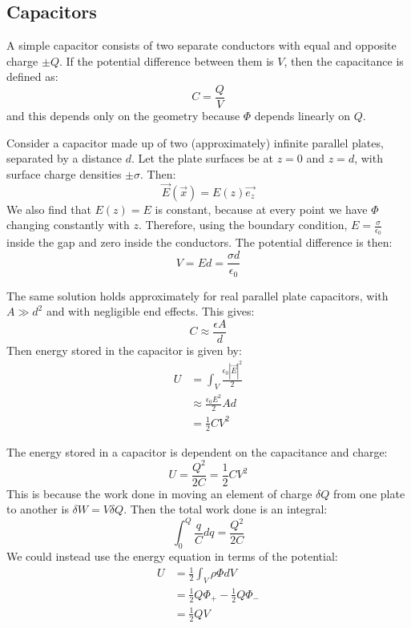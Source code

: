 \documentclass[../Main.tex]{subfiles}
\begin{document}
\subsection{Capacitors}
A simple capacitor consists of two separate conductors with equal and opposite charge $\pm Q$. If the potential difference between them is $V$, then the capacitance is defined as:
\begin{equation}
    C = \frac{Q}{V}
    \label{eqnCapacitance}
\end{equation}
and this depends only on the geometry because $\Phi$ depends linearly on $Q$.
\begin{example}
    Consider a capacitor made up of two (approximately) infinite parallel plates, separated by a distance $d$. Let the plate surfaces be at $z = 0$ and $z = d$, with surface charge densities $\pm \sigma$. Then:
    \begin{equation*}
        \vec{E}(\vec{x}) = E(z) \vec{e_z}
    \end{equation*}
    We also find that $E(z) = E$ is constant, because at every point we have $\Phi$ changing constantly with $z$. Therefore, using the boundary condition, $E = \frac{\sigma}{\epsilon_0}$ inside the gap and zero inside the conductors. The potential difference is then:
    \begin{equation*}
        V = E d = \frac{\sigma d}{\epsilon_0}
    \end{equation*}

    The same solution holds approximately for real parallel plate capacitors, with $A \gg d^2$ and with negligible end effects. This gives:
    \begin{equation*}
        C \approx \frac{\epsilon A}{d}
    \end{equation*}
    Then energy stored in the capacitor is given by:
    \begin{align*}
        U &= \int_V \frac{\epsilon_0 |\vec{E}|^2}{2} \\
        &\approx \frac{\epsilon_0 E^2}{2}Ad \\
        &= \frac12 CV^2
    \end{align*}
\end{example}
The energy stored in a capacitor is dependent on the capacitance and charge:
\begin{equation*}
    U = \frac{Q^2}{2C} = \frac12 CV^2
\end{equation*}
This is because the work done in moving an element of charge $\delta Q$ from one plate to another is $\delta W = V \delta Q$. Then the total work done is an integral:
\begin{equation*}
    \int_{0}^{Q} \frac{q}{C} dq = \frac{Q^2}{2C}
\end{equation*}
We could instead use the energy equation in terms of the potential:
\begin{align*}
    U &=\frac12 \int_V \rho \Phi dV \\
    &= \frac12 Q \Phi_+ - \frac12 Q \Phi_- \\
    &= \frac12 QV
\end{align*}
\end{document}
